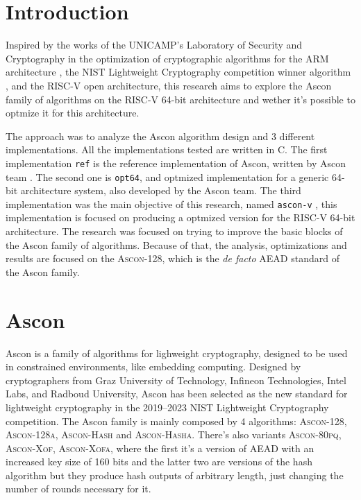 \documentclass[11pt,twoside]{article}
\begin{document}
\section{Introduction}
Inspired by the works of the UNICAMP's Laboratory of Security and Cryptography in the optimization of cryptographic algorithms for the ARM architecture \cite{Fujii2017a}, the NIST Lightweight Cryptography competition winner algorithm \cite{turan2023status}, and the RISC-V open architecture, this research aims to explore the Ascon family of algorithms \cite{asconv12nist} on the RISC-V 64-bit architecture and wether it's possible to optmize it for this architecture.

The approach was to analyze the Ascon algorithm design and 3 different implementations. All the implementations tested are written in C. The first implementation \texttt{ref} is the reference implementation of Ascon, written by Ascon team \cite{asconc2023}. The second one is \texttt{opt64}, and optmized implementation for a generic 64-bit architecture system, also developed by the Ascon team. The  third implementation was the main objective of this research, named \texttt{ascon-v} \cite{asconv2023}, this implementation is focused on producing a optmized version for the RISC-V 64-bit architecture. The research was focused on trying to improve the basic blocks of the Ascon family of algorithms. Because of that, the analysis, optimizations and results are focused on the \textsc{Ascon-128}, which is the \textit{de facto} AEAD standard of the Ascon family.

\section{Ascon}

Ascon is a family of algorithms for lighweight cryptography, designed to be used in constrained environments,
like embedding computing. Designed by cryptographers from Graz University of Technology, Infineon Technologies, Intel Labs, and Radboud University, Ascon has been selected as the new standard for lightweight cryptography in the 2019–2023 NIST Lightweight Cryptography competition. The Ascon family is mainly composed by 4 algorithms: \textsc{Ascon-128}, \textsc{Ascon-128a}, \textsc{Ascon-Hash} and \textsc{Ascon-Hasha}. There's also variants \textsc{Ascon-80pq}, \textsc{Ascon-Xof}, \textsc{Ascon-Xofa}, where the first it's a version of AEAD with an increased key size of 160 bits and the latter two are versions of the hash algorithm but they produce hash outputs of arbitrary
length, just changing the number of rounds necessary for it.
\end{document}
